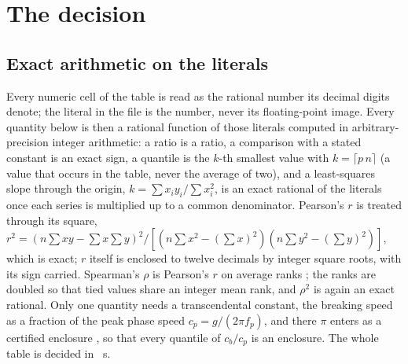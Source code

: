 \documentclass[preprint,11pt,authoryear]{elsarticle}
\begin{document}
\section{The decision}\label{sec:method}

\subsection{Exact arithmetic on the literals}
Every numeric cell of the table is read as the rational number its decimal digits denote; the literal in the file is the number, never its floating-point image. Every quantity below is then a rational function of those literals computed in arbitrary-precision integer arithmetic: a ratio is a ratio, a comparison with a stated constant is an exact sign, a quantile is the $k$-th smallest value with $k = \lceil p\,n \rceil$ (a value that occurs in the table, never the average of two), and a least-squares slope through the origin, $k = \sum x_i y_i / \sum x_i^2$, is an exact rational of the literals once each series is multiplied up to a common denominator. Pearson's $r$ is treated through its square, $r^2 = (n\sum xy - \sum x \sum y)^2 / [(n \sum x^2 - (\sum x)^2)(n \sum y^2 - (\sum y)^2)]$, which is exact; $r$ itself is enclosed to twelve decimals by integer square roots, with its sign carried. Spearman's $\rho$ is Pearson's $r$ on average ranks \citep{spearman1904}; the ranks are doubled so that tied values share an integer mean rank, and $\rho^2$ is again an exact rational. Only one quantity needs a transcendental constant, the breaking speed as a fraction of the peak phase speed $c_p = g/(2\pi f_p)$, and there $\pi$ enters as a certified enclosure \citep{moore2009,rump2010}, so that every quantile of $c_b/c_p$ is an enclosure. The whole table is decided in \LedgerSeconds\ s.
\end{document}
